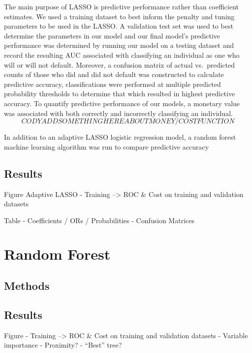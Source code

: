 \documentclass[
]{article}
\begin{document}
The main purpose of LASSO is predictive performance rather than coefficient estimates. We used a training dataset to best inform the penalty and tuning parameters to be used in the LASSO. A validation test set was used to best determine the parameters in our model and our final model's predictive performance was determined by running our model on a testing dataset and record the resulting AUC associated with classifying an individual as one who will or will not default. Moreover, a confusion matrix of actual vs.~predicted counts of those who did and did not default was constructed to calculate predictive accuracy, classifications were performed at multiple predicted probability thresholds to determine that which resulted in highest predictive accuracy. To quantify predictive performance of our models, a monetary value was associated with both correctly and incorrectly classifying an individual.
\[ CODY ADD SOMETHING HERE ABOUT MONEY / COST FUNCTION \]

In addition to an adaptive LASSO logistic regression model, a random forest machine learning algorithm was run to compare predictive accuracy

\hypertarget{results-1}{%
\subsection{Results}\label{results-1}}

Figure Adaptive LASSO
- Training --\textgreater{} ROC \& Cost on training and validation datasets

Table
- Coefficients / ORs / Probabilities
- Confusion Matrices

\hypertarget{random-forest}{%
\section{Random Forest}\label{random-forest}}

\hypertarget{methods-2}{%
\subsection{Methods}\label{methods-2}}

\hypertarget{results-2}{%
\subsection{Results}\label{results-2}}

Figure
- Training --\textgreater{} ROC \& Cost on training and validation datasets
- Variable importance
- Proximity?
- ``Best'' tree?
\end{document}
